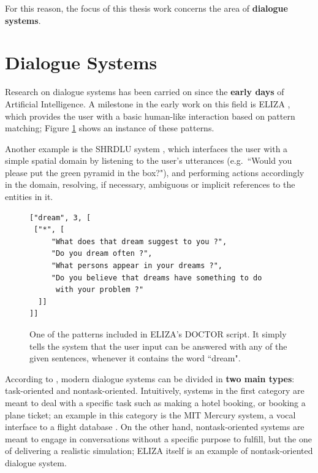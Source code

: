 For this reason, the focus of this thesis work concerns the area of \textbf{dialogue systems}.

\section{Dialogue Systems}\label{ch:introduction:ds}
Research on dialogue systems has been carried on since the \textbf{early days} of Artificial Intelligence. A milestone in the early work on this field is ELIZA \citep{Weizenbaum:1966:ECP:365153.365168}, which provides the user with a basic human-like interaction based on pattern matching; Figure \ref{ch:rw:ds:ELIZA} shows an instance of these patterns.

Another example is the SHRDLU system \citep{winograd1971procedure}, which interfaces the user with a simple spatial domain by listening to the user's utterances (e.g.\ ``Would you please put the green pyramid in the box?"), and performing actions accordingly in the domain, resolving, if necessary, ambiguous or implicit references to the entities in it.

\begin{figure}
\begin{Verbatim}[frame=single]
["dream", 3, [
 ["*", [
     "What does that dream suggest to you ?",
     "Do you dream often ?",
     "What persons appear in your dreams ?",
     "Do you believe that dreams have something to do
      with your problem ?"
  ]]
]]
\end{Verbatim}
\caption[One of the patterns included in ELIZA's DOCTOR script.]{One of the patterns included in ELIZA's DOCTOR script. It simply tells the system that the user input can be answered with any of the given sentences, whenever it contains the word ``dream".}
\label{ch:rw:ds:ELIZA}
\end{figure}

According to \cite{Jokinen2009}, modern dialogue systems can be divided in \textbf{two main types}: task-oriented and nontask-oriented. Intuitively, systems in the first category are meant to deal with a specific task such as making a hotel booking, or booking a plane ticket; an example in this category is the MIT Mercury system, a vocal interface to a flight database \citep{Seneff:2000:DMM:1605285.1605288}. On the other hand, nontask-oriented systems are meant to engage in conversations without a specific purpose to fulfill, but the one of delivering a realistic simulation; ELIZA itself is an example of nontask-oriented dialogue system.

